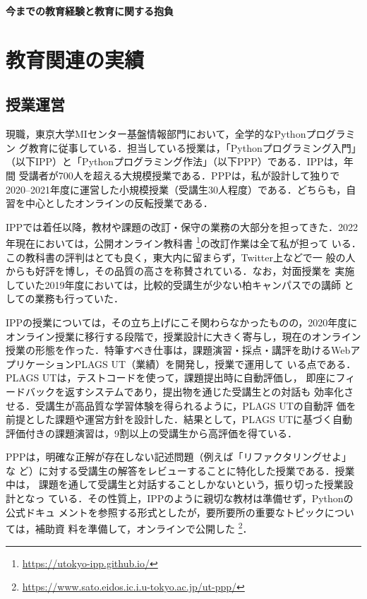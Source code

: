 \documentclass[dvipdfmx]{jsarticle}
\begin{document}
\newpage
\begin{center}
\LARGE\bfseries 今までの教育経験と教育に関する抱負
\end{center}
\bigskip

\section*{教育関連の実績}

\subsection*{授業運営}
現職，東京大学MIセンター基盤情報部門において，全学的なPythonプログラミン
グ教育に従事している．担当している授業は，「Pythonプログラミング入門」
（以下IPP）と「Pythonプログラミング作法」（以下PPP）である．IPPは，年間
受講者が700人を超える大規模授業である．PPPは，私が設計して独りで
2020--2021年度に運営した小規模授業（受講生30人程度）である．どちらも，自
習を中心としたオンラインの反転授業である．

IPPでは着任以降，教材や課題の改訂・保守の業務の大部分を担ってきた．2022
年現在においては，公開オンライン教科書
\footnote{\url{https://utokyo-ipp.github.io/}}の改訂作業は全て私が担って
いる．この教科書の評判はとても良く，東大内に留まらず，Twitter上などで一
般の人からも好評を博し，その品質の高さを称賛されている．なお，対面授業を
実施していた2019年度においては，比較的受講生が少ない柏キャンパスでの講師
としての業務も行っていた．

IPPの授業については，その立ち上げにこそ関わらなかったものの，2020年度に
オンライン授業に移行する段階で，授業設計に大きく寄与し，現在のオンライン
授業の形態を作った．特筆すべき仕事は，課題演習・採点・講評を助けるWebア
プリケーションPLAGS UT（業績\cite{ppl22:plags}）を開発し，授業で運用して
いる点である．PLAGS UTは，テストコードを使って，課題提出時に自動評価し，
即座にフィードバックを返すシステムであり，提出物を通じた受講生との対話も
効率化させる．受講生が高品質な学習体験を得られるように，PLAGS UTの自動評
価を前提とした課題や運営方針を設計した．結果として，PLAGS UTに基づく自動
評価付きの課題演習は，9割以上の受講生から高評価を得ている．

PPPは，明確な正解が存在しない記述問題（例えば「リファクタリングせよ」な
ど）に対する受講生の解答をレビューすることに特化した授業である．授業中は，
課題を通して受講生と対話することしかないという，振り切った授業設計となっ
ている．その性質上，IPPのように親切な教材は準備せず，Pythonの公式ドキュ
メントを参照する形式としたが，要所要所の重要なトピックについては，補助資
料を準備して，オンラインで公開した
\footnote{\url{https://www.sato.eidos.ic.i.u-tokyo.ac.jp/ut-ppp/}}．
\end{document}
